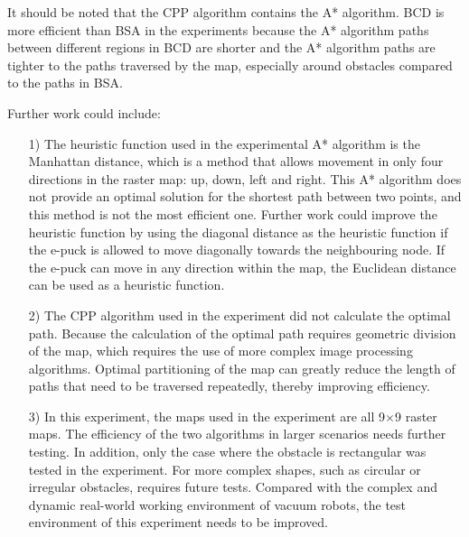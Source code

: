 \documentclass[conference]{IEEEtran}
\begin{document}
It should be noted that the CPP algorithm contains the A* algorithm. BCD is more efficient than BSA in the experiments because the A* algorithm paths between different regions in BCD are shorter and the A* algorithm paths are tighter to the paths traversed by the map, especially around obstacles compared to the paths in BSA.

Further work could include:
\begin{itemize}
  \item [1)]
    The heuristic function used in the experimental A* algorithm is the Manhattan distance, which is a method that allows movement in only four directions in the raster map: up, down, left and right. This A* algorithm does not provide an optimal solution for the shortest path between two points, and this method is not the most efficient one. Further work could improve the heuristic function by using the diagonal distance as the heuristic function if the e-puck is allowed to move diagonally towards the neighbouring node. If the e-puck can move in any direction within the map, the Euclidean distance can be used as a heuristic function.
  \item [2)]
    The CPP algorithm used in the experiment did not calculate the optimal path. Because the calculation of the optimal path requires geometric division of the map, which requires the use of more complex image processing algorithms. Optimal partitioning of the map can greatly reduce the length of paths that need to be traversed repeatedly, thereby improving efficiency.
  \item [3)]
    In this experiment, the maps used in the experiment are all 9$\times$9 raster maps. The efficiency of the two algorithms in larger scenarios needs further testing. In addition, only the case where the obstacle is rectangular was tested in the experiment. For more complex shapes, such as circular or irregular obstacles, requires future tests. Compared with the complex and dynamic real-world working environment of vacuum robots, the test environment of this experiment needs to be improved.
    
\end{itemize}



 

\end{document}

